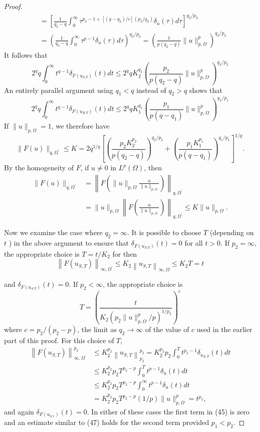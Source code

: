 \begin{proof}
\[\begin{aligned}
  & =\left[\frac{1}{q_2-q} \int_0^{\infty} \tau^{p_2-1+\left[\left(q-q_2\right) / c\right]\left(p_2 / q_2\right)} \delta_u(\tau) d \tau\right]^{q_2 / p_2} \\
  & =\left(\frac{1}{q_2-q} \int_0^{\infty} \tau^{p-1} \delta_u(\tau) d \tau\right)^{q_2 / p_2}=\left(\frac{1}{p\left(q_2-q\right)}\|u\|_{p, \Omega}^p\right)^{q_2 / p_2}
  \end{aligned}
  \]
  It follows that
  \[
  2^q q \int_0^{\infty} t^{q-1} \delta_{F\left(u_{S . T}\right)}(t) d t \leq 2^q q K_2^{q_2}\left(\frac{p_2}{p\left(q_2-q\right)}\|u\|_{p, \Omega}^p\right)^{q_2 / p_2}
  \]
  An entirely parallel argument using $q_1<q$ instead of $q_2>q$ shows that
  \[
  2^q q \int_0^{\infty} t^{q-1} \delta_{F\left(u_{B . T}\right)}(t) d t \leq 2^q q K_1^{q_1}\left(\frac{p_1}{p\left(q-q_1\right)}\|u\|_{p, \Omega}^p\right)^{q_1 / p_1}
  \]
  If $\|u\|_{p, \Omega}=1$, we therefore have
  \[
  \|F(u)\|_{q, \Omega^{\prime}} \leq K=2 q^{1 / q}\left[\left(\frac{p_2 K_2^{p_2}}{p\left(q_2-q\right)}\right)^{q_2 / p_2}+\left(\frac{p_1 K_1^{p_1}}{p\left(q-q_1\right)}\right)^{q_1 / p_1}\right]^{1 / q} .
  \]
  By the homogeneity of $F$, if $u \neq 0$ in $L^p(\Omega)$, then
  \[
  \begin{aligned}
  \|F(u)\|_{q, \Omega^{\prime}} & =\left\|F\left(\|u\|_{p, \Omega} \frac{u}{\|u\|_{p, \Omega}}\right)\right\|_{q, \Omega^{\prime}} \\
  & =\|u\|_{p, \Omega}\left\|F\left(\frac{u}{\|u\|_{p, \Omega}}\right)\right\|_{q, \Omega^{\prime}} \leq K\|u\|_{p, \Omega} .
  \end{aligned}
  \]
  
  Now we examine the case where $q_2=\infty$. It is possible to choose $T$ (depending on $t$ ) in the above argument to ensure that $\delta_{F\left(u_{S . T}\right)}(t)=0$ for all $t>0$. If $p_2=\infty$, the appropriate choice is $T=t / K_2$ for then
  \[
  \left\|F\left(u_{S, T}\right)\right\|_{\infty, \Omega^{\prime}} \leq K_2\left\|u_{S, T}\right\|_{\infty, \Omega} \leq K_2 T=t
  \]
  
  and $\delta_{F\left(u_{S . T}\right)}(t)=0$. If $p_2<\infty$, the appropriate choice is
  \[
  T=\left(\frac{t}{K_2\left(p_2\|u\|_{p, \Omega}^p / p\right)^{1 / p_2}}\right)^c
  \]
  where $c=p_2 /\left(p_2-p\right)$, the limit as $q_2 \rightarrow \infty$ of the value of $c$ used in the earlier part of this proof. For this choice of $T$,
  \[
  \begin{aligned}
  \left\|F\left(u_{S, T}\right)\right\|_{\infty, \Omega^{\prime}}^{p_2} & \leq K_2^{p_2}\left\|u_{S, T}\right\|_{p_2}^{p_2}=K_2^{p_2} p_2 \int_0^T t^{p_2-1} \delta_{u_{S, T}}(t) d t \\
  & \leq K_2^{p_2} p_2 T^{p_2-p} \int_0^T t^{p-1} \delta_u(t) d t \\
  & \leq K_2^{p_2} p_2 T^{p_2-p} \int_0^{\infty} t^{p-1} \delta_u(t) d t \\
  & =K_2^{p_2} p_2 T^{p_2-p}(1 / p)\|u\|_{p, \Omega}^p=t^{p_2},
  \end{aligned}
  \]
  and again $\delta_{F\left(u_{S . r}\right)}(t)=0$. In either of these cases the first term
  in (45) is zero and an estimate similar to (47) holds for the second term provided $p_1<p_2$.
  

\end{proof}
